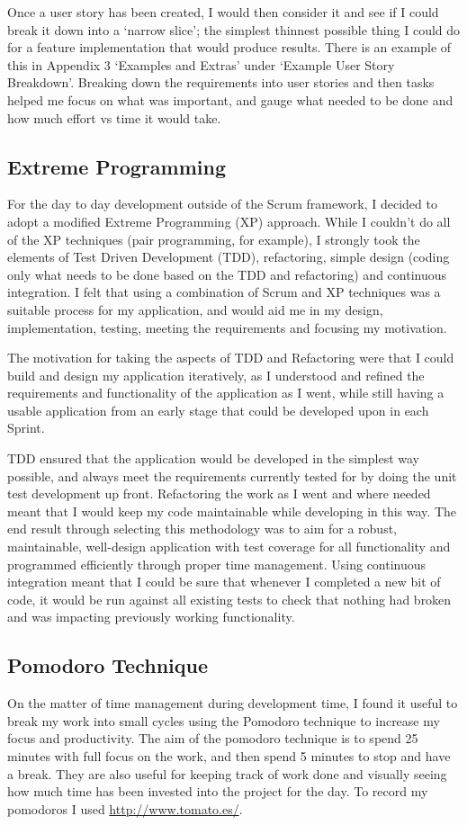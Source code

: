 Once a user story has been created, I would then consider it and see if I could break it down into a `narrow slice'; the simplest thinnest possible thing I could do for a feature implementation that would produce results. There is an example of this in Appendix 3 `Examples and Extras' under `Example User Story Breakdown'. Breaking down the requirements into user stories and then tasks helped me focus on what was important, and gauge what needed to be done and how much effort vs time it would take.

\subsection{Extreme Programming}
For the day to day development outside of the Scrum framework, I decided to adopt a modified Extreme Programming (XP) approach\cite{xp}. While I couldn't do all of the XP techniques (pair programming, for example), I strongly took the elements of Test Driven Development (TDD), refactoring, simple design (coding only what needs to be done based on the TDD and refactoring) and continuous integration. I felt that using a combination of Scrum and XP techniques was a suitable process for my application, and would aid me in my design, implementation, testing, meeting the requirements and focusing my motivation.

The motivation for taking the aspects of TDD and Refactoring were that I could build and design my application iteratively, as I understood and refined the requirements and functionality of the application as I went, while still having a usable application from an early stage that could be developed upon in each Sprint.

TDD ensured that the application would be developed in the simplest way possible, and always meet the requirements currently tested for by doing the unit test development up front. Refactoring the work as I went and where needed meant that I would keep my code maintainable while developing in this way. The end result through selecting this methodology was to aim for a robust, maintainable, well-design application with test coverage for all functionality and programmed efficiently through proper time management. Using continuous integration meant that I could be sure that whenever I completed a new bit of code, it would be run against all existing tests to check that nothing had broken and was impacting previously working functionality.

\subsection{Pomodoro Technique}
On the matter of time management during development time, I found it useful to break my work into small cycles using the Pomodoro technique\cite{citeulike:14021988} to increase my focus and productivity. The aim of the pomodoro technique is to spend 25 minutes with full focus on the work, and then spend 5 minutes to stop and have a break. They are also useful for keeping track of work done and visually seeing how much time has been invested into the project for the day. To record my pomodoros I used \url{http://www.tomato.es/}.
 
